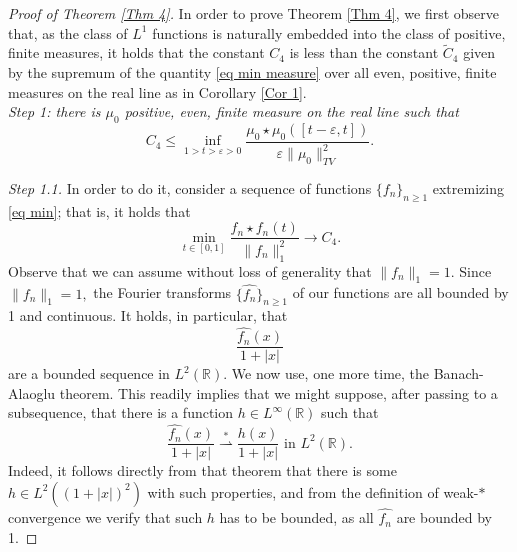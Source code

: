 \documentclass[11pt, reqno]{amsart}
\newcommand{\mmd}{ \mathrm{d}}
\numberwithin{equation}{section}
\newcommand{\R}{{\mathbb R}}
\newcommand{\eps}{{\varepsilon}}
\begin{document}
\begin{proof}[Proof of Theorem \ref{Thm 4}] In order to prove Theorem \ref{Thm 4}, we first observe that, as the class of $L^1$ functions is naturally embedded into the class of positive, 
finite measures, it holds that the constant $C_4$ is less than the constant $\tilde{C}_4$ given by the supremum of the quantity \eqref{eq min measure} over all even, positive, finite measures 
on the real line as in Corollary \ref{Cor 1}.\\ 

\noindent\textit{Step 1: there is $\mu_0$ positive, even, finite measure on the real line such that }
\begin{equation}\label{eq majorize} 
C_4 \le \inf_{1 > t > \eps > 0}\frac{ \mu_0 \star \mu_0 ( [t-\eps,t])}{\eps \|\mu_0\|_{TV}^2}.
\end{equation}

\noindent\textit{Step 1.1.} In order to do it, consider a sequence of functions $\{f_n\}_{n \ge 1}$ extremizing \eqref{eq min}; that is, it holds that 
\[
\min_{t \in [0,1]} \frac{f_n \star f_n(t)}{\|f_n\|_1^2} \to C_4.
\]
Observe that we can assume without loss of generality
that $\|f_n\|_1=1.$
Since $\|f_n\|_1=1,$ the Fourier transforms $\{\widehat{f_n}\}_{n \ge 1}$ of our functions are all bounded by 1 and continuous. It holds, 
in particular, that 
\[
\frac{\widehat{f_n}(x)}{1+|x|} 
\]
are a bounded sequence in $L^2(\R).$ We now use, one more time, the Banach-Alaoglu theorem. This readily implies that we might suppose, after passing to a subsequence, 
that there is a function $h \in L^{\infty}(\R)$ such that 
\[
\frac{\widehat{f_n}(x)}{1+|x|} \overset{\ast}{\rightharpoonup} \frac{h(x)}{1+|x|} \text{ in } L^2(\R).
\]
Indeed, it follows directly from that theorem that there is some $h \in L^2((1+|x|)^2)$ with such properties, and from the definition of weak-$*$ convergence we verify that such $h$ has to be bounded, 
as all $\widehat{f_n}$ are bounded by 1.


\end{proof}
\end{document}
